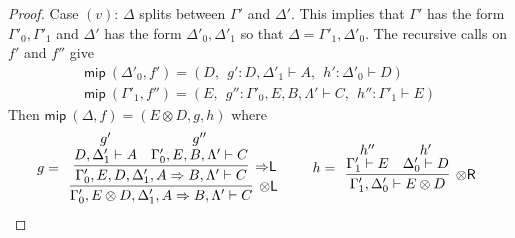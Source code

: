 \documentclass[a4paper,UKenglish,cleveref,autoref,thm-restate, anonymous]{lipics-v2021}
\newcommand{\proofbox}[1]{\begin{array}{c} #1 \end{array}}
\newcommand{\ot}{\otimes}
\newcommand{\Rarr}{\Rightarrow}
\newcommand{\mf}[1]{\mathsf{#1}}
\newcommand{\vars}[1]{\mf{var} (#1)}
\newcommand{\GG}{\Gamma}
\newcommand{\GD}{\Delta}
\newcommand{\GL}{\Lambda}
\newcommand{\vd}{\vdash}
\newcommand{\tl}{{\otimes}\mathsf{L}}
\newcommand{\tr}{{\otimes}\mathsf{R}}
\newcommand{\Rl}{{\Rarr}\mathsf{L}}
\begin{document}
\begin{proof}
Case $(v)$: $\GD$ splits between $\GG'$ and $\GD'$. This implies that $\GG'$ has the form $\GG'_0 , \GG'_1$ and $\GD'$ has the form $\GD'_0 , \GD'_1$ so that $\GD = \GG'_1 , \GD'_0$. The recursive calls on $f'$ and $f''$ give
\[
\begin{array}{l}
\mf{mip}\ (\GD'_0,f')=(D, \ \ g' : D , \GD'_1 \vd A,\ \ h' : \GD'_0 \vd D)
\\
\mf{mip}\ (\GG'_1,f'')=(E,\ \ g'' : \GG'_0 , E , B , \GL' \vd C, \ \ h'' : \GG'_1 \vd E)
\end{array}
\]
  Then $\mf{mip}\ (\GD,f) = (E\ot D ,g, h)$ where
  \begin{equation}\label{case5}
  \begin{array}{c}
    g = \proofbox{
      \infer[\tl]{\GG'_0 , E \ot D  , \GD'_1,A \Rarr B , \GL' \vd C}{
        \infer[\Rl]{\GG'_0 , E , D  , \GD'_1,A \Rarr B , \GL' \vd C}{
          \deduce{D , \GD'_1 \vd A}{g'}
          &
          \deduce{\GG'_0 , E , B , \GL' \vd C}{g''}
        }
      }
    }
    \qquad
    h = \proofbox{
      \infer[\tr]{\GG'_1 , \GD'_0 \vd E \ot D}{
        \deduce{\GG'_1 \vd E}{h''}
        &
        \deduce{\GD'_0 \vd D}{h'}
      }
    }
  \end{array}
  \end{equation}


\end{proof}
\end{document}
